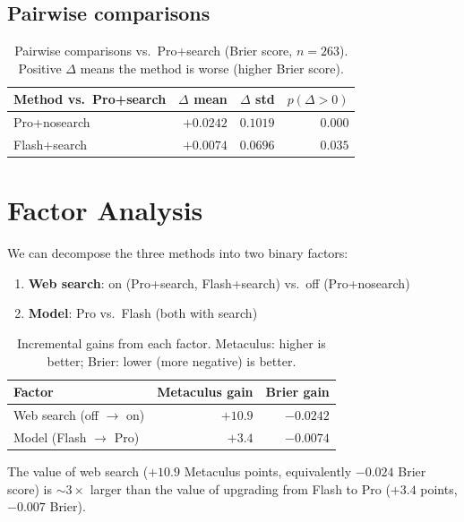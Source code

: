\documentclass[11pt]{article}
\begin{document}
\subsection{Pairwise comparisons}

\begin{table}[h]
\centering
\begin{tabular}{lrrr}
\toprule
Method vs.\ Pro+search & $\Delta$ mean & $\Delta$ std & $p(\Delta > 0)$ \\
\midrule
Pro+nosearch     & $+0.0242$ & $0.1019$ & $0.000$ \\
Flash+search     & $+0.0074$ & $0.0696$ & $0.035$ \\
\bottomrule
\end{tabular}
\caption{Pairwise comparisons vs.\ Pro+search (Brier score, $n=263$).
  Positive $\Delta$ means the method is worse (higher Brier score).}
\label{tab:brier_pairwise}
\end{table}


\section{Factor Analysis}

We can decompose the three methods into two binary factors:
\begin{enumerate}
  \item \textbf{Web search}: on (Pro+search, Flash+search) vs.\ off (Pro+nosearch)
  \item \textbf{Model}: Pro vs.\ Flash (both with search)
\end{enumerate}

\begin{table}[h]
\centering
\begin{tabular}{lrr}
\toprule
Factor & Metaculus gain & Brier gain \\
\midrule
Web search (off $\to$ on) & $+10.9$ & $-0.0242$ \\
Model (Flash $\to$ Pro)   & $+3.4$  & $-0.0074$ \\
\bottomrule
\end{tabular}
\caption{Incremental gains from each factor.  Metaculus: higher is better;
  Brier: lower (more negative) is better.}
\label{tab:factorial}
\end{table}

The value of web search ($+10.9$ Metaculus points, equivalently $-0.024$
Brier score) is $\sim 3\times$ larger than the value of upgrading from
Flash to Pro ($+3.4$ points, $-0.007$ Brier).
\end{document}
